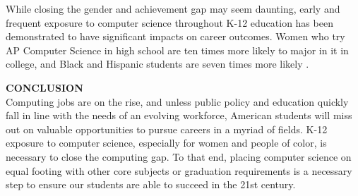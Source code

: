 While closing the gender and achievement gap may seem daunting, early and frequent exposure to computer science throughout K-12 education has been demonstrated to have significant impacts on career outcomes. Women who try AP Computer Science in high school are ten times more likely to major in it in college, and Black and Hispanic students are seven times more likely \cite{apfive}. \par

\textbf{CONCLUSION} \\
Computing jobs are on the rise, and unless public policy and education quickly fall in line with the needs of an evolving workforce, American students will miss out on valuable opportunities to pursue careers in a myriad of fields. K-12 exposure to computer science, especially for women and people of color, is necessary to close the computing gap. To that end, placing computer science on equal footing with other core subjects or graduation requirements is a necessary step to ensure our students are able to succeed in the 21st century. \par




